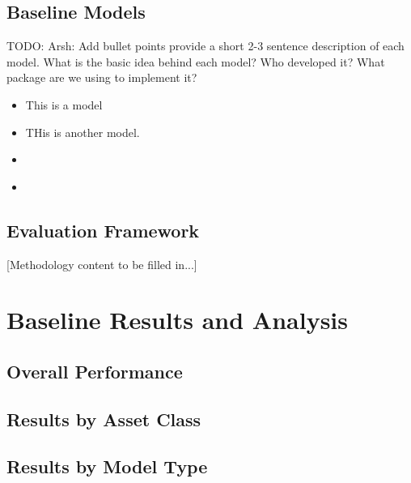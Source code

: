 \documentclass{article}
\begin{document}
\subsection{Baseline Models}
TODO: Arsh: Add bullet points provide a short 2-3 sentence description of each model. What is the basic idea behind each model? Who developed it? What package are we using to implement it? 

\begin{itemize}
    \item This is a model \cite{DeLivera2011}
    \item THis is another model.\cite{Gurkaynak2007}
    \item \cite{Gurkaynak2010}
    \item \cite{Gurkaynak2010}
\end{itemize}

\subsection{Evaluation Framework}

[Methodology content to be filled in...]

\section{Baseline Results and Analysis}
\label{sec:results}


\subsection{Overall Performance}

\subsection{Results by Asset Class}

\subsection{Results by Model Type}
\end{document}

